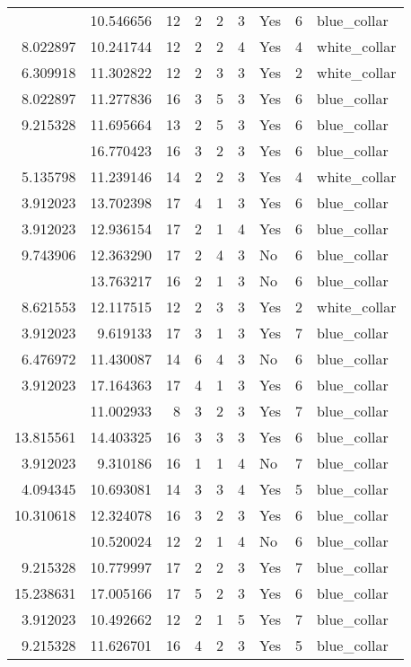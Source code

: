 \documentclass[
]{article}
\begin{document}
\begin{longtable}[t]{rrrrrllrl}
\addlinespace
9.619133 & 10.546656 & 12 & 2 & 2 & 3 & Yes & 6 & blue\_collar\\
8.022897 & 10.241744 & 12 & 2 & 2 & 4 & Yes & 4 & white\_collar\\
6.309918 & 11.302822 & 12 & 2 & 3 & 3 & Yes & 2 & white\_collar\\
8.022897 & 11.277836 & 16 & 3 & 5 & 3 & Yes & 6 & blue\_collar\\
9.215328 & 11.695664 & 13 & 2 & 5 & 3 & Yes & 6 & blue\_collar\\
\addlinespace
14.200807 & 16.770423 & 16 & 3 & 2 & 3 & Yes & 6 & blue\_collar\\
5.135798 & 11.239146 & 14 & 2 & 2 & 3 & Yes & 4 & white\_collar\\
3.912023 & 13.702398 & 17 & 4 & 1 & 3 & Yes & 6 & blue\_collar\\
3.912023 & 12.936154 & 17 & 2 & 1 & 4 & Yes & 6 & blue\_collar\\
9.743906 & 12.363290 & 17 & 2 & 4 & 3 & No & 6 & blue\_collar\\
\addlinespace
3.912023 & 13.763217 & 16 & 2 & 1 & 3 & No & 6 & blue\_collar\\
8.621553 & 12.117515 & 12 & 2 & 3 & 3 & Yes & 2 & white\_collar\\
3.912023 & 9.619133 & 17 & 3 & 1 & 3 & Yes & 7 & blue\_collar\\
6.476972 & 11.430087 & 14 & 6 & 4 & 3 & No & 6 & blue\_collar\\
3.912023 & 17.164363 & 17 & 4 & 1 & 3 & Yes & 6 & blue\_collar\\
\addlinespace
8.707814 & 11.002933 & 8 & 3 & 2 & 3 & Yes & 7 & blue\_collar\\
13.815561 & 14.403325 & 16 & 3 & 3 & 3 & Yes & 6 & blue\_collar\\
3.912023 & 9.310186 & 16 & 1 & 1 & 4 & No & 7 & blue\_collar\\
4.094345 & 10.693081 & 14 & 3 & 3 & 4 & Yes & 5 & blue\_collar\\
10.310618 & 12.324078 & 16 & 3 & 2 & 3 & Yes & 6 & blue\_collar\\
\addlinespace
3.912023 & 10.520024 & 12 & 2 & 1 & 4 & No & 6 & blue\_collar\\
9.215328 & 10.779997 & 17 & 2 & 2 & 3 & Yes & 7 & blue\_collar\\
15.238631 & 17.005166 & 17 & 5 & 2 & 3 & Yes & 6 & blue\_collar\\
3.912023 & 10.492662 & 12 & 2 & 1 & 5 & Yes & 7 & blue\_collar\\
9.215328 & 11.626701 & 16 & 4 & 2 & 3 & Yes & 5 & blue\_collar\\

\end{longtable}
\end{document}
